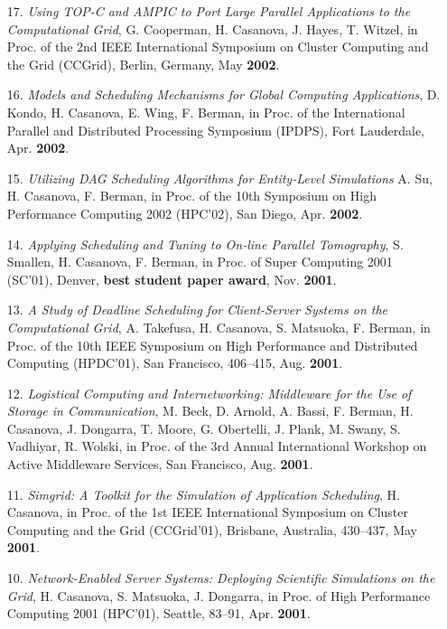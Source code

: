 \begin{enumerate}
\item[17.]
{\it Using TOP-C and AMPIC to Port Large Parallel Applications to the
Computational Grid}, G. Cooperman, H. Casanova, J. Hayes, T. Witzel, in
Proc. of the 2nd IEEE International Symposium on Cluster Computing
and the Grid (CCGrid), Berlin, Germany, May {\bf 2002}.

\item[16.]
{\it Models and Scheduling Mechanisms for Global Computing Applications},
D. Kondo, H. Casanova, E. Wing, F. Berman, in Proc. of the
International Parallel and Distributed Processing Symposium (IPDPS),
Fort Lauderdale, Apr. {\bf 2002}.

\item[15.]
{\it Utilizing DAG Scheduling Algorithms for Entity-Level Simulations}
A. Su, H. Casanova, F. Berman, in Proc. of the 10th Symposium on
High Performance Computing 2002 (HPC'02), San Diego, Apr. {\bf 2002}.

\item[14.]
{\it Applying Scheduling and Tuning to On-line Parallel Tomography},
S. Smallen, H. Casanova, F. Berman, in Proc. of Super Computing 2001
(SC'01), Denver, {\bf best student paper award}, Nov. {\bf 2001}.

\item[13.]
{\it A Study of Deadline Scheduling for Client-Server Systems on the
Computational Grid}, A. Takefusa, H. Casanova, S. Matsuoka, F. Berman, in
Proc. of the 10th IEEE Symposium on High Performance and Distributed
Computing (HPDC'01), San Francisco, 406--415, Aug. {\bf 2001}.

\item[12.]
{\it Logistical Computing and Internetworking: Middleware for the Use
of Storage in Communication}, M. Beck, D. Arnold, A. Bassi, F. Berman,
H. Casanova, J. Dongarra, T. Moore, G. Obertelli, J. Plank, M. Swany,
S. Vadhiyar, R. Wolski, in Proc. of the 3rd Annual International
Workshop on Active Middleware Services, San Francisco, Aug. {\bf 2001}.

\item[11.]
{\it Simgrid: A Toolkit for the Simulation of Application Scheduling},
H. Casanova, in Proc. of the 1st IEEE International Symposium
on Cluster Computing and the Grid (CCGrid'01), Brisbane, Australia,
430--437, May {\bf 2001}.

\item[10.]
{\it Network-Enabled Server Systems: Deploying Scientific Simulations on
the Grid}, H. Casanova, S. Matsuoka, J. Dongarra, in Proc. of High
Performance Computing 2001 (HPC'01), Seattle, 83--91, Apr. {\bf 2001}.


\end{enumerate}
